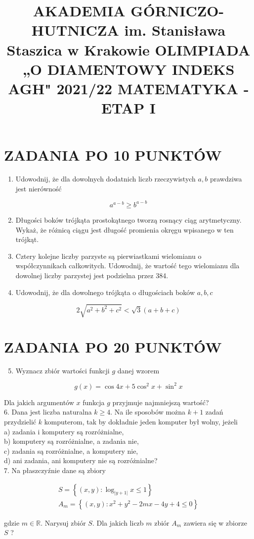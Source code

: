 \documentclass[10pt]{article}
\title{AKADEMIA GÓRNICZO-HUTNICZA im. Stanisława Staszica w Krakowie OLIMPIADA „O DIAMENTOWY INDEKS AGH" 2021/22 MATEMATYKA - ETAP I }
\author{}
\date{}
\begin{document}
\maketitle
\section*{ZADANIA PO 10 PUNKTÓW}
\begin{enumerate}
  \item Udowodnij, że dla dowolnych dodatnich liczb rzeczywistych $a, b$ prawdziwa jest nierówność
\end{enumerate}

$$
a^{a-b} \geqslant b^{a-b}
$$

\begin{enumerate}
  \setcounter{enumi}{1}
  \item Długości boków trójkąta prostokątnego tworzą rosnący ciąg arytmetyczny. Wykaż, że różnicą ciągu jest długość promienia okręgu wpisanego w ten trójkąt.
  \item Cztery kolejne liczby parzyste są pierwiastkami wielomianu o współczynnikach całkowitych. Udowodnij, że wartość tego wielomianu dla dowolnej liczby parzystej jest podzielna przez 384.
  \item Udowodnij, że dla dowolnego trójkąta o długościach boków $a, b, c$
\end{enumerate}

$$
2 \sqrt{a^{2}+b^{2}+c^{2}}<\sqrt{3}(a+b+c)
$$

\section*{ZADANIA PO 20 PUNKTÓW}
\begin{enumerate}
  \setcounter{enumi}{4}
  \item Wyznacz zbiór wartości funkcji $g$ danej wzorem
\end{enumerate}

$$
g(x)=\cos 4 x+5 \cos ^{2} x+\sin ^{2} x
$$

Dla jakich argumentów $x$ funkcja $g$ przyjmuje najmniejszą wartość?\\
6. Dana jest liczba naturalna $k \geqslant 4$. Na ile sposobów można $k+1$ zadań przydzielić $k$ komputerom, tak by dokładnie jeden komputer był wolny, jeżeli\\
a) zadania i komputery są rozróżnialne,\\
b) komputery są rozróżnialne, a zadania nie,\\
c) zadania są rozróżnialne, a komputery nie,\\
d) ani zadania, ani komputery nie są rozróżnialne?\\
7. Na płaszczyźnie dane są zbiory

$$
\begin{gathered}
S=\left\{(x, y): \log _{|y+1|} x \leqslant 1\right\} \\
A_{m}=\left\{(x, y): x^{2}+y^{2}-2 m x-4 y+4 \leqslant 0\right\}
\end{gathered}
$$

gdzie $m \in \mathbb{R}$. Narysuj zbiór $S$. Dla jakich liczb $m$ zbiór $A_{m}$ zawiera się w zbiorze $S$ ?
\end{document}
